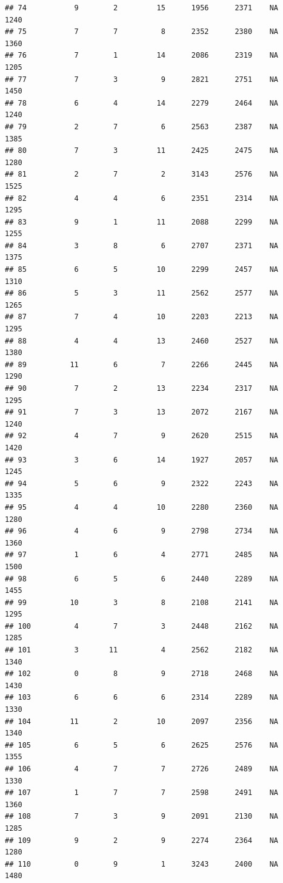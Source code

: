 \documentclass[]{book}
\begin{document}
\begin{verbatim}
## 74           9        2         15      1956      2371    NA    1240
## 75           7        7          8      2352      2380    NA    1360
## 76           7        1         14      2086      2319    NA    1205
## 77           7        3          9      2821      2751    NA    1450
## 78           6        4         14      2279      2464    NA    1240
## 79           2        7          6      2563      2387    NA    1385
## 80           7        3         11      2425      2475    NA    1280
## 81           2        7          2      3143      2576    NA    1525
## 82           4        4          6      2351      2314    NA    1295
## 83           9        1         11      2088      2299    NA    1255
## 84           3        8          6      2707      2371    NA    1375
## 85           6        5         10      2299      2457    NA    1310
## 86           5        3         11      2562      2577    NA    1265
## 87           7        4         10      2203      2213    NA    1295
## 88           4        4         13      2460      2527    NA    1380
## 89          11        6          7      2266      2445    NA    1290
## 90           7        2         13      2234      2317    NA    1295
## 91           7        3         13      2072      2167    NA    1240
## 92           4        7          9      2620      2515    NA    1420
## 93           3        6         14      1927      2057    NA    1245
## 94           5        6          9      2322      2243    NA    1335
## 95           4        4         10      2280      2360    NA    1280
## 96           4        6          9      2798      2734    NA    1360
## 97           1        6          4      2771      2485    NA    1500
## 98           6        5          6      2440      2289    NA    1455
## 99          10        3          8      2108      2141    NA    1295
## 100          4        7          3      2448      2162    NA    1285
## 101          3       11          4      2562      2182    NA    1340
## 102          0        8          9      2718      2468    NA    1430
## 103          6        6          6      2314      2289    NA    1330
## 104         11        2         10      2097      2356    NA    1340
## 105          6        5          6      2625      2576    NA    1355
## 106          4        7          7      2726      2489    NA    1330
## 107          1        7          7      2598      2491    NA    1360
## 108          7        3          9      2091      2130    NA    1285
## 109          9        2          9      2274      2364    NA    1280
## 110          0        9          1      3243      2400    NA    1480

\end{verbatim}
\end{document}
